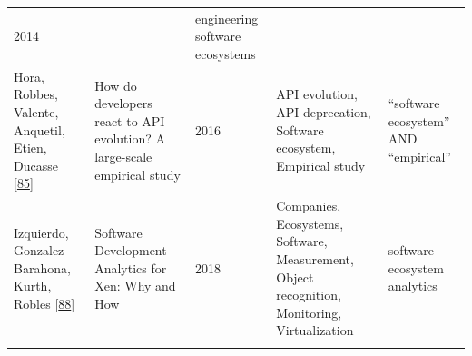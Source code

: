 \documentclass[]{book}
\begin{document}
\begin{longtable}[]{@{}lllll@{}}
\begin{minipage}[t]{0.02\columnwidth}
2014\strut
\end{minipage} & \begin{minipage}[t]{0.34\columnwidth}\raggedright\strut
\strut
\end{minipage} & \begin{minipage}[t]{0.13\columnwidth}\raggedright\strut
engineering software ecosystems\strut
\end{minipage}\tabularnewline
\begin{minipage}[t]{0.05\columnwidth}\raggedright\strut
Hora, Robbes, Valente, Anquetil, Etien, Ducasse
{[}\protect\hyperlink{ref-Hora2016}{85}{]}\strut
\end{minipage} & \begin{minipage}[t]{0.31\columnwidth}\raggedright\strut
How do developers react to API evolution? A large-scale empirical
study\strut
\end{minipage} & \begin{minipage}[t]{0.02\columnwidth}\raggedright\strut
2016\strut
\end{minipage} & \begin{minipage}[t]{0.34\columnwidth}\raggedright\strut
API evolution, API deprecation, Software ecosystem, Empirical
study\strut
\end{minipage} & \begin{minipage}[t]{0.13\columnwidth}\raggedright\strut
``software ecosystem'' AND ``empirical''\strut
\end{minipage}\tabularnewline
\begin{minipage}[t]{0.05\columnwidth}\raggedright\strut
Izquierdo, Gonzalez-Barahona, Kurth, Robles
{[}\protect\hyperlink{ref-Izquierdo2018}{88}{]}\strut
\end{minipage} & \begin{minipage}[t]{0.31\columnwidth}\raggedright\strut
Software Development Analytics for Xen: Why and How\strut
\end{minipage} & \begin{minipage}[t]{0.02\columnwidth}\raggedright\strut
2018\strut
\end{minipage} & \begin{minipage}[t]{0.34\columnwidth}\raggedright\strut
Companies, Ecosystems, Software, Measurement, Object recognition,
Monitoring, Virtualization\strut
\end{minipage} & \begin{minipage}[t]{0.13\columnwidth}\raggedright\strut
software ecosystem analytics\strut
\end{minipage}\tabularnewline
\begin{minipage}[t]{0.05\columnwidth}\raggedright\strut

\end{minipage}
\end{longtable}
\end{document}
